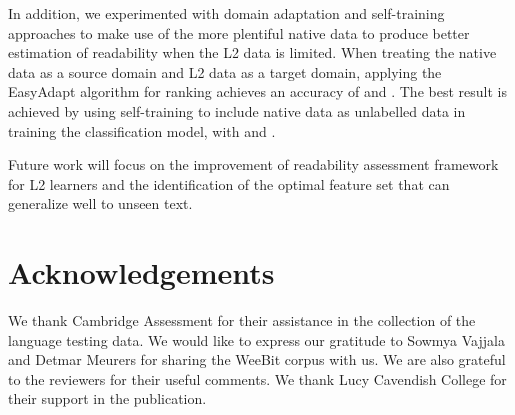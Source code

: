 \documentclass[11pt,letterpaper]{article}
\begin{document}
    In addition, we experimented with domain adaptation and self-training approaches to make use of the more plentiful native data to produce better estimation of readability when the L2 data is limited. When treating the native data as a source domain and L2 data as a target domain, applying the EasyAdapt algorithm for ranking achieves an accuracy of  and  . The best result is achieved by using self-training to include native data as unlabelled data in training the classification model, with  and .
    
    Future work will focus on the improvement of readability assessment framework for L2 learners and the identification of the optimal feature set that can generalize well to unseen text.
    
            
    \section*{Acknowledgements}
    We thank Cambridge Assessment for their assistance in the collection of the language testing data. We would like to express our gratitude to Sowmya Vajjala and Detmar Meurers for sharing the WeeBit corpus with us. We are also grateful to the reviewers for their useful comments. We thank Lucy Cavendish College for their support in the publication.
    



\end{document}
